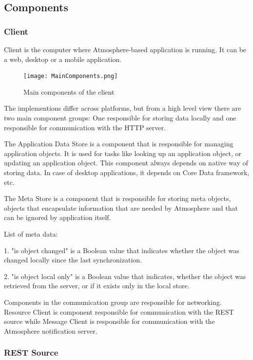 \subsection{Components}

\subsubsection{Client}

Client is the computer where Atmosphere-based application is running. It can be a web, desktop or a mobile application.

\begin{figure}[ht!]
\centering
\texttt{[image: MainComponents.png]}
\caption{Main components of the client \label{fig:3}}
\end{figure}

The implementions differ across platforms, but from a high level view there are two main component groups: One responsible for storing data locally and one responsible for communication with the HTTP server.

The Application Data Store is a component that is responsible for managing application objects. It is used for tasks like looking up an application object, or updating an application object. This component always depends on native way of storing data. In case of desktop applications, it depends on Core Data framework, etc. 

The Meta Store is a component that is responsible for storing meta objects, objects that encapsulate information that are needed by Atmosphere and that can be ignored by application itself.

List of meta data:

1. "is object changed" is a Boolean value that indicates whether the object was changed locally since the last synchronization. 

2. "is object local only" is a Boolean value that indicates, whether the object was retrieved from the server, or if it exists only in the local store. 

Components in the communication group are responsible for networking. Resource Client is component responsible for communication with the REST source while Message Client is responsible for communication with the Atmosphere notification server. 

\subsubsection{REST Source}

